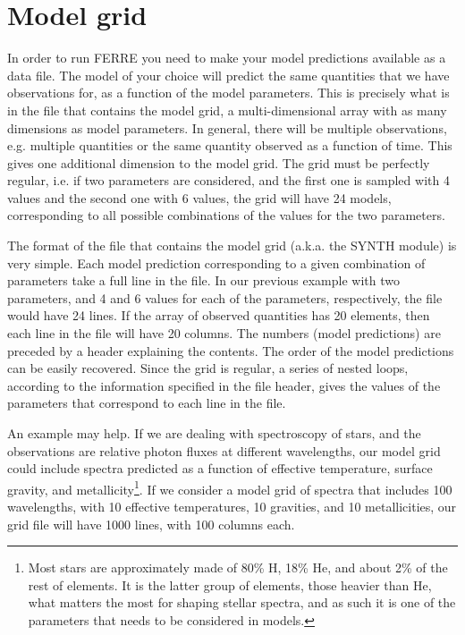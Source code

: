 \documentclass[12pt]{article}
\begin{document}
\section{Model grid}
\label{grid}

In order to run FERRE you need to make your model predictions available 
as a data file. 
The model of your choice will predict
the same quantities that we have observations
for, as a function of the model parameters. This is precisely what
is in the file that contains the model grid, 
a multi-dimensional array
with as many dimensions as model parameters. In general, there will 
be multiple observations, e.g. multiple quantities or the same quantity
observed as a function of time. This gives one additional dimension
to the model grid. The grid must be perfectly regular, 
i.e. if two parameters are considered, and the first one is sampled
with 4 values  and  the second one with 6 values, the grid will 
have 24 models, corresponding to all possible combinations of
the values for the two parameters.    

The format of the file that contains the model grid (a.k.a. the SYNTH
module) is very simple. Each model prediction corresponding to a given
combination of parameters take a full line in the file. In our previous
example with two parameters, and 4 and 6 values for each of the parameters,
respectively, the file would have 24 lines. If the array of observed
quantities has 20 elements, then each line in the file will have 20 
columns. The numbers (model predictions) are preceded by
a header explaining the contents.   The order of the model predictions
can be easily recovered. Since the grid is regular, a series of
nested loops, according to the information  specified in the file header, 
gives  the values of the parameters that correspond to each line 
in the file.    

An example may help. If we are dealing with spectroscopy of stars,
and the observations are relative photon fluxes at different wavelengths,
our model grid could include spectra predicted as a function of 
effective temperature, surface gravity, and 
metallicity\footnote{Most stars are approximately made of 80\%  H, 18\% He, 
and about 2\% of the rest of elements. It is the latter group of elements, 
those heavier than He, what matters the most for shaping stellar spectra, 
and as such it is one of the parameters that needs to be considered in 
models.}.
If we consider a model grid of spectra that includes 100 wavelengths, 
with 10 effective temperatures, 10 gravities,
and 10 metallicities, our grid file will have 1000 lines, with 100 columns each.
\end{document}
